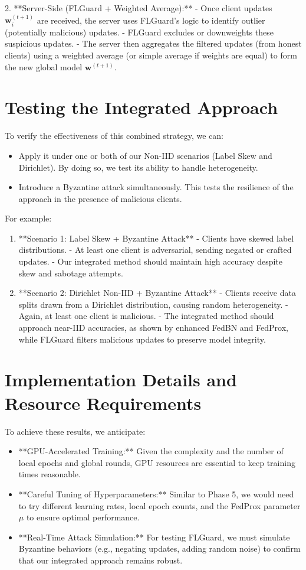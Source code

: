 \documentclass[12pt,a4paper]{report}
\begin{document}
2. **Server-Side (FLGuard + Weighted Average):**
- Once client updates $\mathbf{w}_i^{(t+1)}$ are received, the server uses FLGuard’s logic to identify outlier (potentially malicious) updates.
- FLGuard excludes or downweights these suspicious updates.
- The server then aggregates the filtered updates (from honest clients) using a weighted average (or simple average if weights are equal) to form the new global model $\mathbf{w}^{(t+1)}$.

\section{Testing the Integrated Approach}

To verify the effectiveness of this combined strategy, we can:
\begin{itemize}
	\item Apply it under one or both of our Non-IID scenarios (Label Skew and Dirichlet). By doing so, we test its ability to handle heterogeneity.
	\item Introduce a Byzantine attack simultaneously. This tests the resilience of the approach in the presence of malicious clients.
\end{itemize}

For example:
\begin{enumerate}
	\item **Scenario 1: Label Skew + Byzantine Attack**
	- Clients have skewed label distributions.
	- At least one client is adversarial, sending negated or crafted updates.
	- Our integrated method should maintain high accuracy despite skew and sabotage attempts.
	
	\item **Scenario 2: Dirichlet Non-IID + Byzantine Attack**
	- Clients receive data splits drawn from a Dirichlet distribution, causing random heterogeneity.
	- Again, at least one client is malicious.
	- The integrated method should approach near-IID accuracies, as shown by enhanced FedBN and FedProx, while FLGuard filters malicious updates to preserve model integrity.
\end{enumerate}

\section{Implementation Details and Resource Requirements}

To achieve these results, we anticipate:
\begin{itemize}
	\item **GPU-Accelerated Training:** Given the complexity and the number of local epochs and global rounds, GPU resources are essential to keep training times reasonable.
	\item **Careful Tuning of Hyperparameters:** Similar to Phase 5, we would need to try different learning rates, local epoch counts, and the FedProx parameter $\mu$ to ensure optimal performance.
	\item **Real-Time Attack Simulation:** For testing FLGuard, we must simulate Byzantine behaviors (e.g., negating updates, adding random noise) to confirm that our integrated approach remains robust.
\end{itemize}
\end{document}
